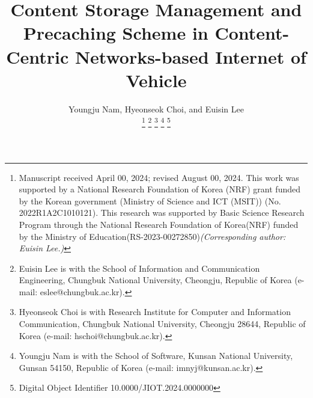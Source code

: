 \documentclass[journal]{IEEEtran}
\begin{document}
%
\title{Content Storage Management and Precaching Scheme in Content-Centric Networks-based Internet of Vehicle}
%
%
%

\newcommand{\orcidauthorA}{0000-0003-3971-0715} %
\newcommand{\orcidauthorB}{0000-0001-9410-7244} %
\newcommand{\orcidauthorC}{0000-0002-0422-0647} %

\author{Youngju Nam,
        Hyeonseok Choi,
        and Euisin Lee%

\thanks{Manuscript received April 00, 2024; revised August 00, 2024.
This work was supported by a National Research Foundation of Korea (NRF) grant funded by the Korean government (Ministry of Science and ICT (MSIT)) (No. 2022R1A2C1010121).
This research was supported by Basic Science Research Program through the National Research Foundation of Korea(NRF) funded by the Ministry of Education(RS-2023-00272850)\textit{(Corresponding author: Euisin Lee.)}}
\thanks{Euisin Lee is with the School of Information and Communication Engineering, Chungbuk National University, Cheongju, Republic of Korea (e-mail: eslee@chungbuk.ac.kr).}%
\thanks{Hyeonseok Choi is with Research Institute for Computer and Information Communication, Chungbuk National University, Cheongju 28644, Republic of Korea (e-mail: hschoi@chungbuk.ac.kr).}
\thanks{Youngju Nam is with the School of Software, Kunsan National University, Gunsan 54150, Republic of Korea (e-mail: imnyj@kunsan.ac.kr).}
\thanks{Digital Object Identifier 10.0000/JIOT.2024.0000000}}
\end{document}
